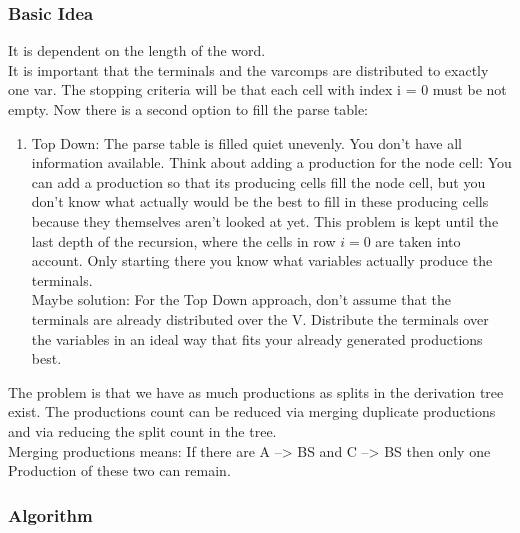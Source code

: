 \subsubsection{Basic Idea} 
It is dependent on the length of the word.\\
It is important that the terminals and the varcomps are distributed to exactly one var.
The stopping criteria will be that each cell with index i = 0 must be not empty.
Now there is a second option to fill the parse table:
\begin{enumerate}
	\item Top Down: The parse table is filled quiet unevenly. You don't have all information available. Think about adding a production for the node cell: You can add a production so that its producing cells fill the node cell, but you don't know what actually would be the best to fill in these producing cells because they themselves aren't looked at yet. This problem is kept until the last depth of the recursion, where the cells in row $i=0$ are taken into account. Only starting there you know what variables actually produce the terminals.\\
	Maybe solution: For the Top Down approach, don't assume that the terminals are already distributed over the V. Distribute the terminals over the variables in an ideal way that fits your already generated productions best.
\end{enumerate}
The problem is that we have as much productions as splits in the derivation tree exist. The productions count can be reduced via merging duplicate productions and via reducing the split count in the tree. \\
Merging productions means: If there are A --> BS and C --> BS then only one Production of these two can remain.\\
\subsubsection{Algorithm}
\pagebreak
\noindent
{}

